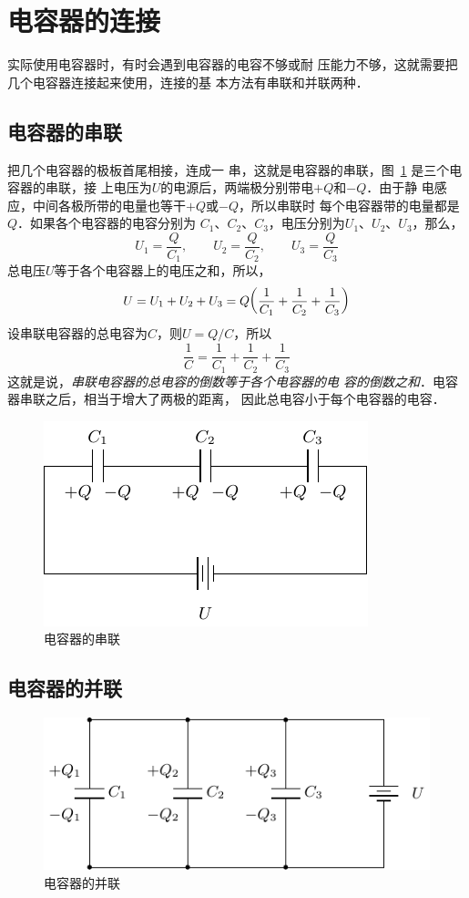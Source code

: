 \section{电容器的连接}
实际使用电容器时，有时会遇到电容器的电容不够或耐
压能力不够，这就需要把几个电容器连接起来使用，连接的基
本方法有串联和并联两种．
\subsection{电容器的串联}

把几个电容器的极板首尾相接，连成一
串，这就是电容器的串联，图~\ref{fig_B_6-40} 是三个电容器的串联，接
上电压为$U$的电源后，两端极分别带电$+Q$和$-Q$．由于静
电感应，中间各极所带的电量也等干$+Q$或$-Q$，所以串联时
每个电容器带的电量都是$Q$．如果各个电容器的电容分别为
$C_1$、$C_2$、$C_3$，电压分别为$U_1$、$U_2$、$U_3$，那么，
\[ U_1=\frac{Q}{C_1},\qquad U_2=\frac{Q}{C_2},\qquad U_3=\frac{Q}{C_3}\]
总电压$U$等于各个电容器上的电压之和，所以，
\[U=U_1+U_2+U_3=Q\qty(\frac{1}{C_1}+\frac{1}{C_2}+\frac{1}{C_3})\]
设串联电容器的总电容为$C$，则$U=Q/C$，所以
\[\frac{1}{C}=\frac{1}{C_1}+\frac{1}{C_2}+\frac{1}{C_3}\]
这就是说，\textit{串联电容器的总电容的倒数等于各个电容器的电
容的倒数之和}．电容器串联之后，相当于增大了两极的距离，
因此总电容小于每个电容器的电容．

\begin{figure}[htbp]
    \centering
    \includegraphics{fig/B/6-40.pdf}
    \caption{电容器的串联}\label{fig_B_6-40}
\end{figure}



\subsection{电容器的并联} 
\begin{figure}[htbp]
    \centering
    \includegraphics{fig/B/6-41.pdf}
    \caption{电容器的并联}\label{fig_B_6-41}
\end{figure}    

